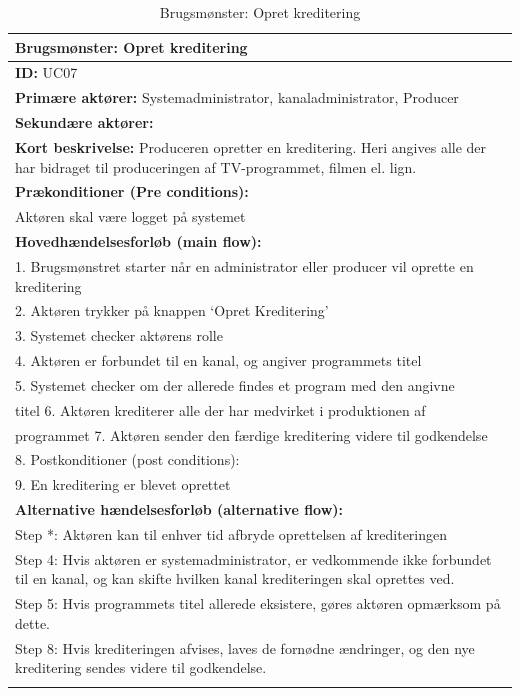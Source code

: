\begin{longtable}[h] {|p{16cm}|}
\hline
    \textbf{Brugsmønster:} Opret kreditering \\
    \hline
	\textbf{ID:} UC07 \\ \hline
	\textbf{Primære aktører:} Systemadministrator, kanaladministrator, Producer \\ \hline
	\textbf{Sekundære aktører:} \\ \hline
	\textbf{Kort beskrivelse:} Produceren opretter en kreditering. Heri angives alle der har bidraget til produceringen af TV-programmet, filmen el. lign. \\ \hline
	\textbf{Prækonditioner (Pre conditions):} \\
Aktøren skal være logget på systemet \\ \hline
\textbf{Hovedhændelsesforløb (main flow):} \\
	1. Brugsmønstret starter når en administrator eller producer vil oprette en kreditering \\
	2. Aktøren trykker på knappen ‘Opret Kreditering’ \\
	3. Systemet checker aktørens rolle \\
	4. Aktøren er forbundet til en kanal, og angiver programmets titel \\
	5. Systemet checker om der allerede findes et program med den angivne \\ titel
	6. Aktøren krediterer alle der har medvirket i produktionen af \\ programmet
	7. Aktøren sender den færdige kreditering videre til godkendelse \\
	8. Postkonditioner (post conditions): \\
	9. En kreditering er blevet oprettet \\ \hline
	\textbf{Alternative hændelsesforløb (alternative flow):} \\
Step *: Aktøren kan til enhver tid afbryde oprettelsen af krediteringen \\
Step 4: Hvis aktøren er systemadministrator, er vedkommende ikke forbundet til en kanal, og kan skifte hvilken kanal krediteringen skal oprettes ved. \\

Step 5: Hvis programmets titel allerede eksistere, gøres aktøren opmærksom på dette. \\

Step 8: Hvis krediteringen afvises, laves de fornødne ændringer, og den nye kreditering sendes videre til godkendelse. \\
\hline
\caption{Brugsmønster: Opret kreditering}
\label{tab:create_credits}
\end{longtable}